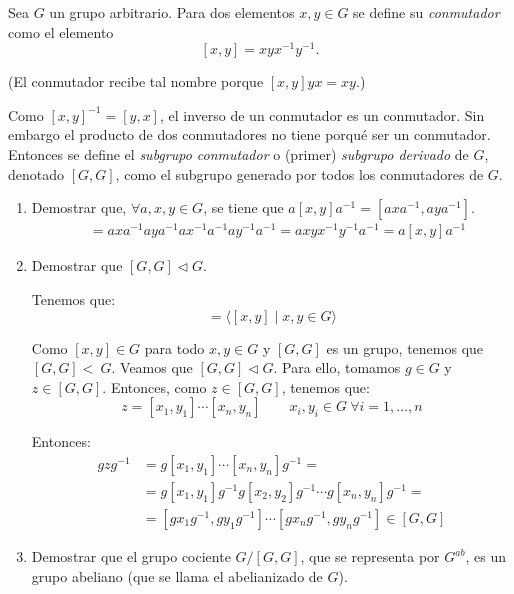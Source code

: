 \begin{ejercicio}
    Sea $G$ un grupo arbitrario. Para dos elementos $x,y\in G$ se define su \emph{conmutador} como el elemento
    \[
        [x,y] = xyx^{-1}y^{-1}.
    \]
    \begin{observacion}
        (El conmutador recibe tal nombre porque $[x,y]yx=xy$.)
    \end{observacion}
    
    Como $[x,y]^{-1}=[y,x]$, el inverso de un conmutador es un conmutador. Sin embargo el producto de dos conmutadores no tiene porqué ser un conmutador. Entonces se define el \emph{subgrupo conmutador} o (primer) \emph{subgrupo derivado} de $G$, denotado $[G,G]$, como el subgrupo generado por todos los conmutadores de $G$.
    \begin{enumerate}
        \item Demostrar que, $\forall a,x,y\in G$, se tiene que $a[x,y]a^{-1}=[axa^{-1},aya^{-1}]$.
        \begin{align*}
            [axa^{-1},aya^{-1}] &= axa^{-1}aya^{-1}ax^{-1}a^{-1}ay^{-1}a^{-1} = axyx^{-1}y^{-1}a^{-1} = a[x,y]a^{-1}
        \end{align*}
        \item Demostrar que $[G,G]\lhd G$.
        
        Tenemos que:
        \begin{equation*}
            [G,G] = \langle [x,y]\mid x,y\in G\rangle
        \end{equation*}

        Como $[x,y]\in G$ para todo $x,y\in G$ y $[G,G]$ es un grupo, tenemos que $[G,G]<~G$. Veamos que $[G,G]\lhd G$. Para ello, tomamos $g\in G$ y $z\in [G,G]$. Entonces, como $z\in [G,G]$, tenemos que:
        \begin{equation*}
            z = [x_1,y_1]\cdots[x_n,y_n]\qquad x_i,y_i\in G\ \forall i=1,\ldots,n
        \end{equation*}

        Entonces:
        \begin{align*}
            gzg^{-1} &= g[x_1,y_1]\cdots[x_n,y_n]g^{-1} =\\&=
            g[x_1,y_1]g^{-1}g[x_2,y_2]g^{-1}\cdots g[x_n,y_n]g^{-1} =\\&=
            [g x_1 g^{-1},g y_1 g^{-1}]\cdots[g x_n g^{-1},g y_n g^{-1}] \in [G,G]
        \end{align*}
        \item Demostrar que el grupo cociente $G/[G,G]$, que se representa por $G^{ab}$, es un grupo abeliano (que se llama el abelianizado de $G$).
        

\end{enumerate}
\end{ejercicio}
